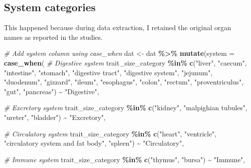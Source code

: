 \documentclass[
]{article}
\newenvironment{Shaded}{\begin{snugshade}}{\end{snugshade}}
\newcommand{\AttributeTok}[1]{\textcolor[rgb]{0.13,0.29,0.53}{#1}}
\newcommand{\CommentTok}[1]{\textcolor[rgb]{0.56,0.35,0.01}{\textit{#1}}}
\newcommand{\FunctionTok}[1]{\textcolor[rgb]{0.13,0.29,0.53}{\textbf{#1}}}
\newcommand{\NormalTok}[1]{#1}
\newcommand{\OtherTok}[1]{\textcolor[rgb]{0.56,0.35,0.01}{#1}}
\newcommand{\SpecialCharTok}[1]{\textcolor[rgb]{0.81,0.36,0.00}{\textbf{#1}}}
\newcommand{\StringTok}[1]{\textcolor[rgb]{0.31,0.60,0.02}{#1}}
\begin{document}
\subsection{System categories}\label{system-categories}

This happened because during data extraction, I retained the original organ names as reported in the studies.

\begin{Shaded}
\begin{Highlighting}[]
\CommentTok{\# Add system column using case\_when}
\NormalTok{dat }\OtherTok{\textless{}{-}}\NormalTok{ dat }\SpecialCharTok{\%\textgreater{}\%}
  \FunctionTok{mutate}\NormalTok{(}\AttributeTok{system =} \FunctionTok{case\_when}\NormalTok{(}
    \CommentTok{\# Digestive system}
\NormalTok{    trait\_size\_category }\SpecialCharTok{\%in\%} \FunctionTok{c}\NormalTok{(}\StringTok{"liver"}\NormalTok{, }\StringTok{"caecum"}\NormalTok{, }\StringTok{"intestine"}\NormalTok{, }\StringTok{"stomach"}\NormalTok{, }
                              \StringTok{"digestive tract"}\NormalTok{, }\StringTok{"digestive system"}\NormalTok{,}
                              \StringTok{"jejunum"}\NormalTok{, }\StringTok{"duodenum"}\NormalTok{, }\StringTok{"gizzard"}\NormalTok{, }\StringTok{"ileum"}\NormalTok{,}
                              \StringTok{"esophagus"}\NormalTok{, }\StringTok{"colon"}\NormalTok{, }\StringTok{"rectum"}\NormalTok{, }\StringTok{"proventriculus"}\NormalTok{,}
                              \StringTok{"gut"}\NormalTok{, }\StringTok{"pancreas"}\NormalTok{) }\SpecialCharTok{\textasciitilde{}} \StringTok{"Digestive"}\NormalTok{,}
    
    \CommentTok{\# Excretory system}
\NormalTok{    trait\_size\_category }\SpecialCharTok{\%in\%} \FunctionTok{c}\NormalTok{(}\StringTok{"kidney"}\NormalTok{, }\StringTok{"malpighian tubules"}\NormalTok{, }\StringTok{"ureter"}\NormalTok{, }
                              \StringTok{"bladder"}\NormalTok{) }\SpecialCharTok{\textasciitilde{}} \StringTok{"Excretory"}\NormalTok{,}
    
    \CommentTok{\# Circulatory system}
\NormalTok{    trait\_size\_category }\SpecialCharTok{\%in\%} \FunctionTok{c}\NormalTok{(}\StringTok{"heart"}\NormalTok{, }\StringTok{"ventricle"}\NormalTok{, }\StringTok{"circulatory system and fat body"}\NormalTok{,}
                              \StringTok{"spleen"}\NormalTok{) }\SpecialCharTok{\textasciitilde{}} \StringTok{"Circulatory"}\NormalTok{,}
    
    \CommentTok{\# Immune system}
\NormalTok{    trait\_size\_category }\SpecialCharTok{\%in\%} \FunctionTok{c}\NormalTok{(}\StringTok{"thymus"}\NormalTok{, }\StringTok{"bursa"}\NormalTok{) }\SpecialCharTok{\textasciitilde{}} \StringTok{"Immune"}\NormalTok{,}
    

\end{Highlighting}
\end{Shaded}
\end{document}
